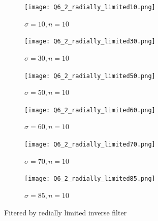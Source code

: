 \documentclass[
	12pt, %
]{style/fphw}
\begin{document}
\begin{figure}[H]
	\centering
	\begin{subfigure}[b]{.3\textwidth}
		\centering
		\texttt{[image: Q6\_2\_radially\_limited10.png]}
		\caption{$\sigma = 10, n = 10$}
		\label{Q6_2_radially_limited10}
	\end{subfigure}
	\hfill
	\begin{subfigure}[b]{.3\textwidth}
		\centering
		\texttt{[image: Q6\_2\_radially\_limited30.png]}
		\caption{$\sigma = 30, n = 10$}
		\label{Q6_2_radially_limited30}
	\end{subfigure}
	\hfill
	\begin{subfigure}[b]{.3\textwidth}
		\centering
		\texttt{[image: Q6\_2\_radially\_limited50.png]}
		\caption{$\sigma = 50, n = 10$}
		\label{Q6_2_radially_limited50}
	\end{subfigure}
	\vfill
	\begin{subfigure}[b]{.3\textwidth}
		\centering
		\texttt{[image: Q6\_2\_radially\_limited60.png]}
		\caption{$\sigma = 60, n = 10$}
		\label{Q6_2_radially_limited60}
	\end{subfigure}
	\hfill
	\begin{subfigure}[b]{.3\textwidth}
		\centering
		\texttt{[image: Q6\_2\_radially\_limited70.png]}
		\caption{$\sigma = 70, n = 10$}
		\label{Q6_2_radially_limited70}
	\end{subfigure}
	\hfill
	\begin{subfigure}[b]{.3\textwidth}
		\centering
		\texttt{[image: Q6\_2\_radially\_limited85.png]}
		\caption{$\sigma = 85, n = 10$}
		\label{Q6_2_radially_limited85}
	\end{subfigure}
	\caption{Fitered by redially limited inverse filter}
	\label{redially limited inverse filter}	
\end{figure}
\end{document}
